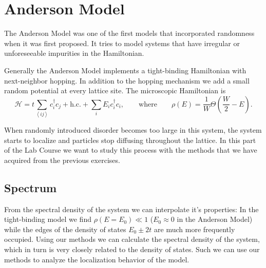 \documentclass[../main.tex]{subfiles}
\begin{document}
\section{Anderson Model}

The Anderson Model was one of the first models that incorporated randomness when it was first proposed.
It tries to model systems that have irregular or unforeseeable impurities in the Hamiltonian.
\par

Generally the Anderson Model implements a tight-binding Hamiltonian with next-neighbor hopping.
In addition to the hopping mechanism we add a small random potential at every lattice site.
The microscopic Hamiltonian is 
\[
    \mathcal{H} = t\sum\limits_{\left<i j \right>}^{ } c_i^{\dagger} c_j + \text{h.c.}  + \sum_{i}^{ }  E_i c_i^{\dagger} c_i, 
    \qquad \text{where} \qquad
    \rho(E) = \frac{1}{W}\Theta\left( \frac{W}{2} - E \right)
.\] 

When randomly introduced disorder becomes too large in this system, the system starts to localize and particles stop diffusing throughout the lattice.
In this part of the Lab Course we want to study this process with the methods that we have acquired from the previous exercises.


\subsection{Spectrum}

From the spectral density of the system we can interpolate it's properties:
In the tight-binding model we find $\rho(E=E_0) \ll 1$ ($E_0 \approx 0$ in the Anderson Model) while the edges of the density of states $E_0 \pm 2t$ are much more frequently occupied.
Using our methods we can calculate the spectral density of the system, which in turn is very closely related to the density of states.
Such we can use our methods to analyze the localization behavior of the model.


\subsection{}



\ifSubfilesClassLoaded{
}{
    \newpage
}
\end{document}
